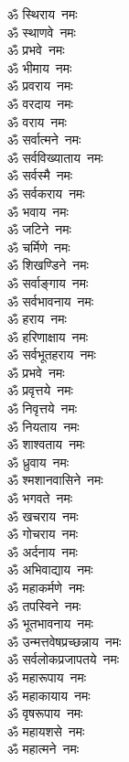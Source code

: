 \begin{multicols}{2}
\begin{flushleft}
ॐ स्थिराय~नमः\\
ॐ स्थाणवे~नमः\\
ॐ प्रभवे~नमः\\
ॐ भीमाय~नमः\\
ॐ प्रवराय~नमः\\
ॐ वरदाय~नमः\\
ॐ वराय~नमः\\
ॐ सर्वात्मने~नमः\\
ॐ सर्वविख्याताय~नमः\\
ॐ सर्वस्मै~नमः\hfill{}\\
ॐ सर्वकराय~नमः\\
ॐ भवाय~नमः\\
ॐ जटिने~नमः\\
ॐ चर्मिणे~नमः\\
ॐ शिखण्डिने~नमः\\
ॐ सर्वाङ्गाय~नमः\\
ॐ सर्वभावनाय~नमः\\
ॐ हराय~नमः\\
ॐ हरिणाक्षाय~नमः\\
ॐ सर्वभूतहराय~नमः\hfill{}\\
ॐ प्रभवे~नमः\\
ॐ प्रवृत्तये~नमः\\
ॐ निवृत्तये~नमः\\
ॐ नियताय~नमः\\
ॐ शाश्वताय~नमः\\
ॐ ध्रुवाय~नमः\\
ॐ श्मशानवासिने~नमः\\
ॐ भगवते~नमः\\
ॐ खचराय~नमः\\
ॐ गोचराय~नमः\hfill{}\\
ॐ अर्दनाय~नमः\\
ॐ अभिवाद्याय~नमः\\
ॐ महाकर्मणे~नमः\\
ॐ तपस्विने~नमः\\
ॐ भूतभावनाय~नमः\\
ॐ उन्मत्तवेषप्रच्छन्नाय~नमः\\
ॐ सर्वलोकप्रजापतये~नमः\\
ॐ महारूपाय~नमः\\
ॐ महाकायाय~नमः\\
ॐ वृषरूपाय~नमः\hfill{}\\
ॐ महायशसे~नमः\\
ॐ महात्मने~नमः\\

\end{flushleft}
\end{multicols}
